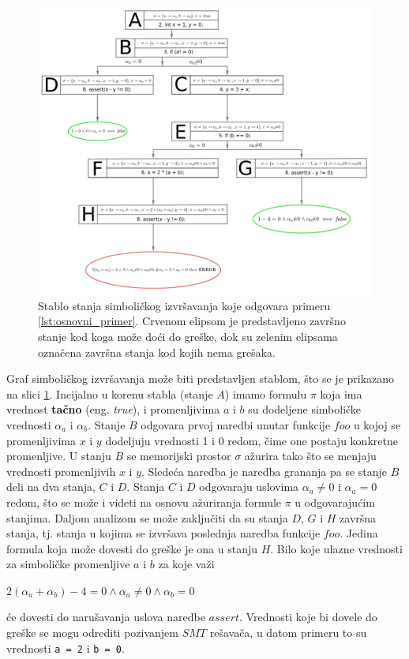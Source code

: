 \documentclass[12pt,oneside]{memoir}
\begin{document}
\begin{figure}[ht]
    \centering
    \includegraphics[width=1.0\linewidth]{osnovni_primer.png}
    \caption{Stablo stanja simboličkog izvršavanja koje odgovara primeru \ref{lst:osnovni_primer}. Crvenom elipsom je predstavljeno završno stanje kod koga može doći do greške, dok su zelenim elipsama označena završna stanja kod kojih nema grešaka.}
    \label{fig:osnovni_primer}
\end{figure}

Graf simboličkog izvršavanja može biti predstavljen stablom, što se je prikazano na slici \ref{fig:osnovni_primer}. Incijalno u korenu stabla (stanje $A$) imamo formulu $\pi$ koja ima vrednost \textbf{tačno} (eng. \textit{true}), i promenljivima $a$ i $b$ su dodeljene simboličke vrednosti $\alpha_a$ i $\alpha_b$. Stanje $B$ odgovara prvoj naredbi unutar funkcije $foo$ u kojoj se promenljivima $x$ i $y$ dodeljuju vrednosti 1 i 0 redom, čime one postaju konkretne promenljive. U stanju $B$ se memorijski prostor $\sigma$ ažurira tako što se menjaju vrednosti promenljivih $x$ i $y$. Sledeća naredba je naredba grananja pa se stanje $B$ deli na dva stanja, $C$ i $D$. Stanja $C$ i $D$ odgovaraju uslovima $\alpha_a \neq 0$ i $\alpha_a = 0$ redom, što se može i videti na osnovu ažuriranja formule $\pi$ u odgovarajućim stanjima. Daljom analizom se može zaključiti da su stanja $D$, $G$ i $H$ završna stanja, tj. stanja u kojima se izvršava poslednja naredba funkcije $foo$. Jedina formula koja može dovesti do greške je ona u stanju $H$. Bilo koje ulazne vrednosti za simboličke promenljive $a$ i $b$ za koje važi
\vskip 0.2in
\centerline{$2(\alpha_a + \alpha_b) - 4 = 0 \land \alpha_a \neq 0 \land \alpha_b = 0$}
\vskip 0.2in
\noindent će dovesti do narušavanja uslova naredbe $assert$. Vrednosti koje bi dovele do greške se mogu odrediti pozivanjem $SMT$ rešavača, u datom primeru to su vrednosti \texttt{a = 2} i \texttt{b = 0}.
\end{document}
